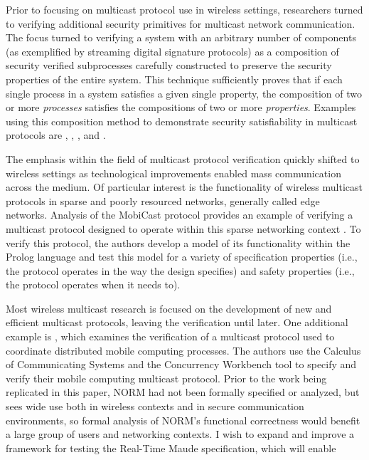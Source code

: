 \documentclass[10pt, journal]{IEEEtran}
\begin{document}
Prior to focusing on multicast protocol use in wireless settings, researchers turned to verifying additional security primitives for multicast network communication. The focus turned to verifying a system with an arbitrary number of components (as exemplified by streaming digital signature protocols) as a composition of security verified subprocesses carefully constructed to preserve the security properties of the entire system. This technique sufficiently proves that if each single process in a system satisfies a given single property, the composition of two or more \textit{processes} satisfies the compositions of two or more \textit{properties}. Examples using this composition method to demonstrate security satisfiability in multicast protocols are \cite{Gorrieri2008}, \cite{Martina2015}, \cite{Bella2002}, and \cite{Archer2002}.

The emphasis within the field of multicast protocol verification quickly shifted to wireless settings as technological improvements enabled mass communication across the medium. Of particular interest is the functionality of wireless multicast protocols in sparse and poorly resourced networks, generally called edge networks. Analysis of the MobiCast protocol provides an example of verifying a multicast protocol designed to operate within this sparse networking context \cite{Tan2000}. To verify this protocol, the authors develop a model of its functionality within the Prolog language and test this model for a variety of specification properties (i.e., the protocol operates in the way the design specifies) and safety properties (i.e., the protocol operates when it needs to). 

Most wireless multicast research is focused on the development of new and efficient multicast protocols, leaving the verification until later. One additional example is \cite{Anastasi2000}, which examines the verification of a multicast protocol used to coordinate distributed mobile computing processes. The authors use the Calculus of Communicating Systems \cite{Milner1989} and the Concurrency Workbench tool \cite{Cleaveland1996} to specify and verify their mobile computing multicast protocol. Prior to the work being replicated in this paper, NORM had not been formally specified or analyzed, but sees wide use both in wireless contexts and in secure communication environments, so formal analysis of NORM's functional correctness would benefit a large group of users and networking contexts. I wish to expand and improve a framework for testing the Real-Time Maude specification, which will enable
\end{document}
